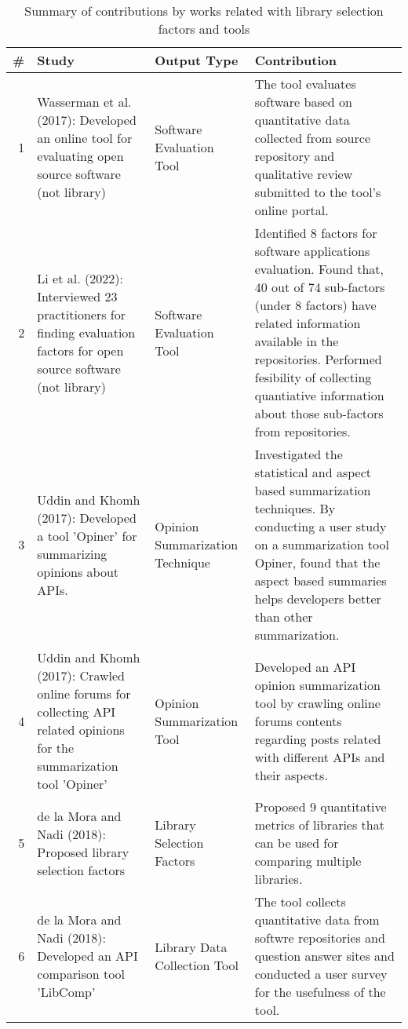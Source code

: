 \begin{table*}[htbp]
  \centering
  \caption{Summary of contributions by works related with library selection factors and tools}
  \begin{tabular}{rp{18.585em}p{6em}p{28.085em}}
    \toprule
    {\textbf{\#}} & \textbf{Study} & \textbf{Output Type} & \textbf{Contribution} \\
    \midrule
    1 & Wasserman et al. (2017): Developed an online tool for evaluating open source software (not library) \cite{wasserman2017osspal} & Software Evaluation Tool & The tool evaluates software based on quantitative data collected from source repository and qualitative review submitted to the tool's online portal. \\
    2 & Li et al. (2022): Interviewed 23 practitioners for finding evaluation factors for open source software (not library) \cite{li2022exploring} & Software Evaluation Tool & Identified 8 factors for software applications evaluation. Found that, 40 out of 74 sub-factors (under 8 factors) have related information available in the repositories. Performed fesibility of collecting quantiative information about those sub-factors from repositories.  \\
    3 & Uddin and Khomh (2017): Developed a tool 'Opiner' for summarizing opinions about APIs. \cite{uddin2017automatic}  & Opinion Summarization Technique & Investigated the statistical and aspect based summarization techniques. By conducting a user study on a summarization tool Opiner, found that the aspect based summaries helps developers better than other summarization. \\
    4 & Uddin and Khomh (2017): Crawled online forums for collecting API related opinions for the summarization tool 'Opiner' \cite{uddin2017opiner}  & Opinion Summarization Tool & Developed an API opinion summarization tool by crawling online forums contents regarding posts related with different APIs and their aspects. \\
    5 & de la Mora and Nadi (2018): Proposed library selection factors \cite{de2018library}  & Library Selection Factors & Proposed 9 quantitative metrics of libraries that can be used for comparing multiple libraries. \\
    6 & de la Mora and Nadi (2018): Developed an API comparison tool 'LibComp' \cite{de2018empirical}  & Library Data Collection Tool & The tool collects quantitative data from softwre repositories and question answer sites and conducted a user survey for the usefulness of the tool. \\

\end{tabular}
\end{table*}
